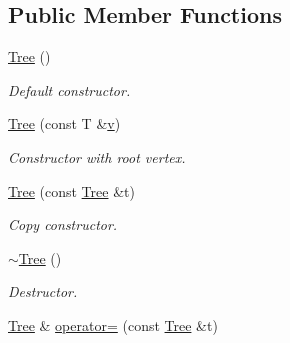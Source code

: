 \subsection*{Public Member Functions}
\begin{DoxyCompactItemize}
\item 
\hypertarget{class_d_o_1_1_tree_a3dee5770ede29888f2c0136bbd7f5a95}{\hyperlink{class_d_o_1_1_tree_a3dee5770ede29888f2c0136bbd7f5a95}{Tree} ()}\label{class_d_o_1_1_tree_a3dee5770ede29888f2c0136bbd7f5a95}

\begin{DoxyCompactList}\small\item\em Default constructor. \end{DoxyCompactList}\item 
\hypertarget{class_d_o_1_1_tree_ab2eeead563db79ec963561503f3db441}{\hyperlink{class_d_o_1_1_tree_ab2eeead563db79ec963561503f3db441}{Tree} (const T \&\hyperlink{group___channel_accessors_ga1dd2524c5b8d3db33137eedb803fc2ce}{v})}\label{class_d_o_1_1_tree_ab2eeead563db79ec963561503f3db441}

\begin{DoxyCompactList}\small\item\em Constructor with root vertex. \end{DoxyCompactList}\item 
\hypertarget{class_d_o_1_1_tree_a9603ba799d51fe7b2e8d2ac78abfa535}{\hyperlink{class_d_o_1_1_tree_a9603ba799d51fe7b2e8d2ac78abfa535}{Tree} (const \hyperlink{class_d_o_1_1_tree}{Tree} \&t)}\label{class_d_o_1_1_tree_a9603ba799d51fe7b2e8d2ac78abfa535}

\begin{DoxyCompactList}\small\item\em Copy constructor. \end{DoxyCompactList}\item 
\hypertarget{class_d_o_1_1_tree_a4d2d4eaa9ac9d347549728060df29842}{\hyperlink{class_d_o_1_1_tree_a4d2d4eaa9ac9d347549728060df29842}{$\sim$\-Tree} ()}\label{class_d_o_1_1_tree_a4d2d4eaa9ac9d347549728060df29842}

\begin{DoxyCompactList}\small\item\em Destructor. \end{DoxyCompactList}\item 
\hypertarget{class_d_o_1_1_tree_a54e71c610e133a9fb85c1b156d94da42}{\hyperlink{class_d_o_1_1_tree}{Tree} \& \hyperlink{class_d_o_1_1_tree_a54e71c610e133a9fb85c1b156d94da42}{operator=} (const \hyperlink{class_d_o_1_1_tree}{Tree} \&t)}\label{class_d_o_1_1_tree_a54e71c610e133a9fb85c1b156d94da42}


\end{DoxyCompactItemize}
